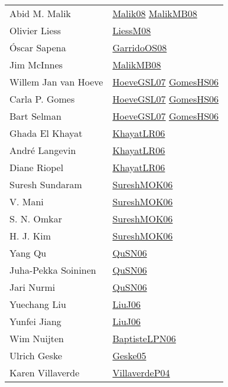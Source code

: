 {\begin{longtable}{p{4cm}p{15cm}}
Abid M. Malik & \href{}{Malik08}\cite{Malik08} \href{articles/MalikMB08.pdf}{MalikMB08}\cite{MalikMB08} \\
Olivier Liess & \href{articles/LiessM08.pdf}{LiessM08}\cite{LiessM08} \\
{\'{O}}scar Sapena & \href{articles/GarridoOS08.pdf}{GarridoOS08}\cite{GarridoOS08} \\
Jim McInnes & \href{articles/MalikMB08.pdf}{MalikMB08}\cite{MalikMB08} \\
Willem Jan van Hoeve & \href{papers/HoeveGSL07.pdf}{HoeveGSL07}\cite{HoeveGSL07} \href{papers/GomesHS06.pdf}{GomesHS06}\cite{GomesHS06} \\
Carla P. Gomes & \href{papers/HoeveGSL07.pdf}{HoeveGSL07}\cite{HoeveGSL07} \href{papers/GomesHS06.pdf}{GomesHS06}\cite{GomesHS06} \\
Bart Selman & \href{papers/HoeveGSL07.pdf}{HoeveGSL07}\cite{HoeveGSL07} \href{papers/GomesHS06.pdf}{GomesHS06}\cite{GomesHS06} \\
Ghada El Khayat & \href{articles/KhayatLR06.pdf}{KhayatLR06}\cite{KhayatLR06} \\
Andr{\'{e}} Langevin & \href{articles/KhayatLR06.pdf}{KhayatLR06}\cite{KhayatLR06} \\
Diane Riopel & \href{articles/KhayatLR06.pdf}{KhayatLR06}\cite{KhayatLR06} \\
Suresh Sundaram & \href{articles/SureshMOK06.pdf}{SureshMOK06}\cite{SureshMOK06} \\
V. Mani & \href{articles/SureshMOK06.pdf}{SureshMOK06}\cite{SureshMOK06} \\
S. N. Omkar & \href{articles/SureshMOK06.pdf}{SureshMOK06}\cite{SureshMOK06} \\
H. J. Kim & \href{articles/SureshMOK06.pdf}{SureshMOK06}\cite{SureshMOK06} \\
Yang Qu & \href{papers/QuSN06.pdf}{QuSN06}\cite{QuSN06} \\
Juha{-}Pekka Soininen & \href{papers/QuSN06.pdf}{QuSN06}\cite{QuSN06} \\
Jari Nurmi & \href{papers/QuSN06.pdf}{QuSN06}\cite{QuSN06} \\
Yuechang Liu & \href{papers/LiuJ06.pdf}{LiuJ06}\cite{LiuJ06} \\
Yunfei Jiang & \href{papers/LiuJ06.pdf}{LiuJ06}\cite{LiuJ06} \\
Wim Nuijten & \href{}{BaptisteLPN06}\cite{BaptisteLPN06} \\
Ulrich Geske & \href{papers/Geske05.pdf}{Geske05}\cite{Geske05} \\
Karen Villaverde & \href{papers/VillaverdeP04.pdf}{VillaverdeP04}\cite{VillaverdeP04} \\

\end{longtable}}
